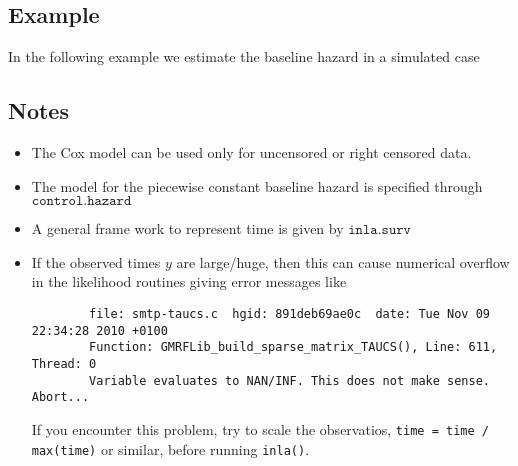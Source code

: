 \documentclass[a4paper,11pt]{article}
\begin{document}
\subsection*{Example}

In the following example we estimate the baseline hazard in a simulated
case 

\subsection*{Notes}

\begin{itemize}
\item The Cox model can be used only for uncensored or right censored data.
\item The model for the piecewise constant baseline hazard is
    specified through $\texttt{control.hazard}$
\item A general frame work to represent time is given by
    $\texttt{inla.surv}$
\item If the observed times $y$ are large/huge, then this can cause
    numerical overflow in the likelihood routines giving error
    messages like
\begin{verbatim}
        file: smtp-taucs.c  hgid: 891deb69ae0c  date: Tue Nov 09 22:34:28 2010 +0100
        Function: GMRFLib_build_sparse_matrix_TAUCS(), Line: 611, Thread: 0
        Variable evaluates to NAN/INF. This does not make sense. Abort...
\end{verbatim}
    If you encounter this problem, try to scale the observatios,
    \verb|time = time / max(time)| or similar, before running
    \verb|inla()|. 
\end{itemize}
\end{document}
